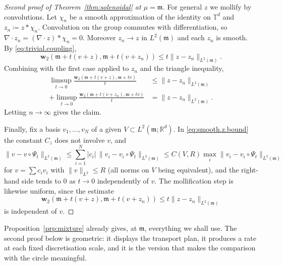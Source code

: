 \documentclass[11pt,reqno]{amsart}
\theoremstyle{plain}
\theoremstyle{definition}
\newcommand{\dw}{\mathbf{w}_2}
\newcommand{\T}{\mathbb{T}}
\newcommand{\R}{\mathbb{R}}
\newcommand{\Leb}{\mathfrak{m}}
\begin{document}
\begin{proof}[Second proof of Theorem~\ref{thm:solenoidal} at \(\mu=\Leb\)]
    For general \(z\) we mollify by convolutions.
    Let \( \chi_n \) be a smooth approximation of the identity on \( \T^d \) and \( z_n\coloneqq z*\chi_n \).
    Convolution on the group commutes with differentiation, so \( \nabla\cdot z_n=(\nabla\cdot z)*\chi_n=0 \).
    Moreover \( z_n\to z \) in \( L^2(\Leb) \) and each \( z_n \) is smooth.
    By \eqref{eq:trivial.coupling},
    \[
        \dw\left(\Leb+t(v+z),\Leb+t(v+z_n)\right)\le t\lVert z-z_n \rVert_{L^2(\Leb)} .
    \]
    Combining with the first case applied to \( z_n \) and the triangle inequality,
    \[
        \begin{split}
            \limsup_{t\to0}\frac{\dw\left(\Leb+t(v+z),\Leb+tv\right)}{t}
             & \le\lVert z-z_n \rVert_{L^2(\Leb)} \\
            +\limsup_{t\to0} \frac{\dw\left(\Leb+t(v+z_n),\Leb+tv\right)}{t}
             & =\lVert z-z_n \rVert_{L^2(\Leb)}.
        \end{split}
    \]
    Letting \( n\to\infty \) gives the claim.

    Finally, fix a basis \( v_1,\dots,v_N \) of a given \( V\subset L^2(\Leb;\R^d) \).
    In \eqref{eq:smooth.z.bound} the constant \( C_z \) does not involve \( v \), and
    \[
        \lVert v-v\circ\Psi_t \rVert_{L^2(\Leb)}\le\sum_{i=1}^N\lvert c_i \rvert\,\lVert v_i-v_i\circ\Psi_t \rVert_{L^2(\Leb)}
        \le C(V,R)\max_i\lVert v_i-v_i\circ\Psi_t \rVert_{L^2(\Leb)}
    \]
    for \( v=\sum c_iv_i \) with \( \lVert v \rVert_{L^2}\le R \) (all norms on \( V \) being equivalent), and the right-hand side tends to \( 0 \) as \( t\to0 \) independently of \( v \).
    The mollification step is likewise uniform, since the estimate
    \[
        \dw(\Leb+t(v+z),\Leb+t(v+z_n))
        \le t\lVert z-z_n \rVert_{L^2(\Leb)}
    \]
    is independent of \(v\).
\end{proof}


Proposition~\ref{prp:mixture} already gives, at \(\Leb\), everything we shall use. 
The second proof below is geometric: it displays the transport plan, it produces a rate at each fixed discretisation scale, and it is the version that makes the comparison with the circle meaningful.
\end{document}

